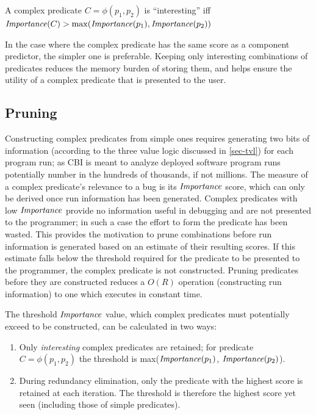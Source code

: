 \begin{defn}
\label{dfn3}
A complex predicate $C = \phi(p_1, p_2)$ is ``interesting'' iff $\mathit{Importance}(C) > \max(\mathit{Importance}(p_1), \mathit{Importance}(p_2))$
\end{defn}

In the case where the complex predicate has the same score as a component predictor, the simpler one is preferable.  Keeping only interesting combinations of predicates reduces the memory burden of storing them, and helps ensure the utility of a complex predicate that is presented to the user.

\subsection{Pruning}
\label{sec-pruning}
Constructing complex predicates from simple ones requires generating two bits of information (according to the three value logic discussed in \autoref{sec-tvl}) for each program run; as CBI is meant to analyze deployed software program runs potentially number in the hundreds of thousands, if not millions.  The measure of a complex predicate's relevance to a bug is its $\mathit{Importance}$ score, which can only be derived once run information has been generated.  Complex predicates with low $\mathit{Importance}$ provide no information useful in debugging and are not presented to the programmer; in such a case the effort to form the predicate has been wasted.  This provides the motivation to prune combinations before run information is generated based on an estimate of their resulting scores.  If this estimate falls below the threshold required for the predicate to be presented to the programmer, the complex predicate is not constructed.  Pruning predicates before they are constructed reduces a $O(R)$ operation (constructing run information) to one which executes in constant time.

The threshold $\mathit{Importance}$ value, which complex predicates must potentially exceed to be constructed, can be calculated in two ways:
\begin{enumerate}
\item Only \emph{interesting} complex predicates are retained; for predicate $C = \phi(p_1, p_2)$ the threshold is max($\mathit{Importance}(p_1)$, $\mathit{Importance}(p_2)$).
\item During redundancy elimination, only the predicate with the highest score is retained at each iteration.  The threshold is therefore the highest score yet seen (including those of simple predicates).
\end{enumerate}

